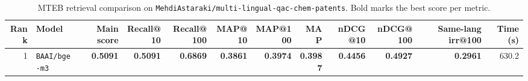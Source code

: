 \begin{table}[t]
\centering
\small
\begin{tabular}{r l r r r r r r r r r r}
\hline
Rank & Model & Main score & Recall@10 & Recall@100 & MAP@10 & MAP@100 & MAP & nDCG@10 & nDCG@100 & Same-lang irr@100 & Time (s) \\
\hline
1 & \texttt{BAAI/bge-m3} & \textbf{0.5091} & \textbf{0.5091} & \textbf{0.6869} & \textbf{0.3861} & \textbf{0.3974} & \textbf{0.3987} & \textbf{0.4456} & \textbf{0.4927} & \textbf{0.2961} & 630.2 \\
\hline
\end{tabular}
\caption{MTEB retrieval comparison on \texttt{MehdiAstaraki/multi-lingual-qac-chem-patents}. Bold marks the best score per metric.}
\label{tab:mteb-model-comparison}
\end{table}
